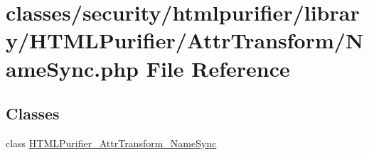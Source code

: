 \hypertarget{NameSync_8php}{\section{classes/security/htmlpurifier/library/\+H\+T\+M\+L\+Purifier/\+Attr\+Transform/\+Name\+Sync.php File Reference}
\label{NameSync_8php}
}
\subsection*{Classes}
\begin{DoxyCompactItemize}
\item 
class \hyperlink{classHTMLPurifier__AttrTransform__NameSync}{H\+T\+M\+L\+Purifier\+\_\+\+Attr\+Transform\+\_\+\+Name\+Sync}
\end{DoxyCompactItemize}
